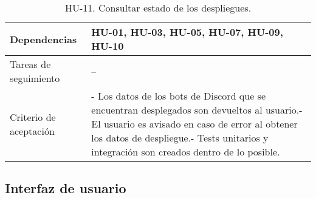 \begin{table}[H]
\begin{adjustbox}{max width=\textwidth}
\begin{tabularx}{\textwidth}{l|L}
        Dependencias & HU-01, HU-03, HU-05, HU-07, HU-09, HU-10 \\ \hline
        Tareas de seguimiento & – \\ \hline
        Criterio de aceptación & - Los datos de los bots de Discord que se encuentran desplegados son devueltos al usuario.\linebreak - El usuario es avisado en caso de error al obtener los datos de despliegue.\linebreak - Tests unitarios y integración son creados dentro de lo posible. \\ \hline
    \end{tabularx}
    \end{adjustbox}
    \caption{HU-11. Consultar estado de los despliegues.}
\end{table}

\subsection{Interfaz de usuario}

